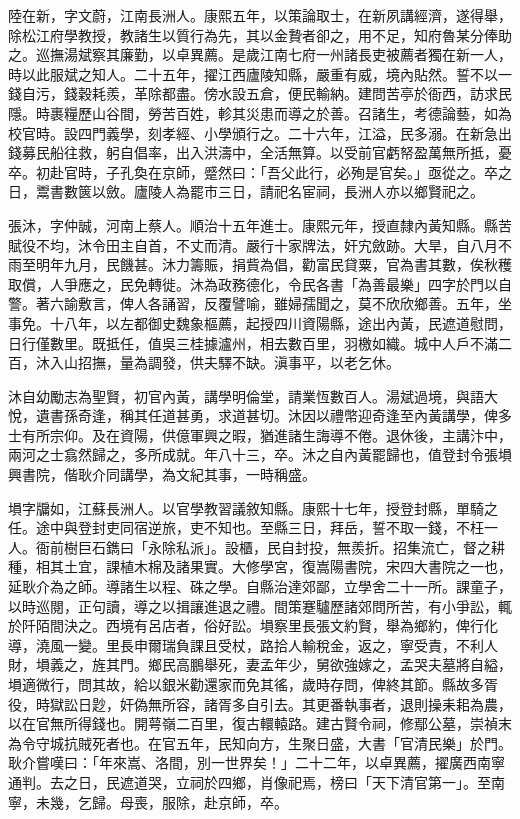 \begin{pinyinscope}
陸在新，字文蔚，江南長洲人。康熙五年，以策論取士，在新夙講經濟，遂得舉，除松江府學教授，教諸生以質行為先，其以金贄者卻之，用不足，知府魯某分俸助之。巡撫湯斌察其廉勤，以卓異薦。是歲江南七府一州諸長吏被薦者獨在新一人，時以此服斌之知人。二十五年，擢江西廬陵知縣，嚴重有威，境內貼然。誓不以一錢自污，錢穀耗羨，革除都盡。傍水設五倉，便民輸納。建問苦亭於衙西，訪求民隱。時裹糧歷山谷間，勞苦百姓，軫其災患而導之於善。召諸生，考德論藝，如為校官時。設四門義學，刻孝經、小學頒行之。二十六年，江溢，民多溺。在新急出錢募民船往救，躬自倡率，出入洪濤中，全活無算。以受前官虧帑盈萬無所抵，憂卒。初赴官時，子孔奐在京師，蹙然曰：「吾父此行，必殉是官矣。」亟從之。卒之日，鬻書數篋以斂。廬陵人為罷市三日，請祀名宦祠，長洲人亦以鄉賢祀之。

張沐，字仲誠，河南上蔡人。順治十五年進士。康熙元年，授直隸內黃知縣。縣苦賦役不均，沐令田主自首，不丈而清。嚴行十家牌法，奸宄斂跡。大旱，自八月不雨至明年九月，民饑甚。沐力籌賑，捐貲為倡，勸富民貸粟，官為書其數，俟秋穫取償，人爭應之，民免轉徙。沐為政務德化，令民各書「為善最樂」四字於門以自警。著六諭敷言，俾人各誦習，反覆譬喻，雖婦孺聞之，莫不欣欣鄉善。五年，坐事免。十八年，以左都御史魏象樞薦，起授四川資陽縣，途出內黃，民遮道慰問，日行僅數里。既抵任，值吳三桂據瀘州，相去數百里，羽檄如織。城中人戶不滿二百，沐入山招撫，量為調發，供夫驛不缺。滇事平，以老乞休。

沐自幼勵志為聖賢，初官內黃，講學明倫堂，請業恆數百人。湯斌過境，與語大悅，遺書孫奇逢，稱其任道甚勇，求道甚切。沐因以禮幣迎奇逢至內黃講學，俾多士有所宗仰。及在資陽，供億軍興之暇，猶進諸生誨導不倦。退休後，主講汴中，兩河之士翕然歸之，多所成就。年八十三，卒。沐之自內黃罷歸也，值登封令張塤興書院，偕耿介同講學，為文紀其事，一時稱盛。

塤字牖如，江蘇長洲人。以官學教習議敘知縣。康熙十七年，授登封縣，單騎之任。途中與登封吏同宿逆旅，吏不知也。至縣三日，拜岳，誓不取一錢，不枉一人。衙前樹巨石鐫曰「永除私派」。設櫃，民自封投，無羨折。招集流亡，督之耕種，相其土宜，課植木棉及諸果實。大修學宮，復嵩陽書院，宋四大書院之一也，延耿介為之師。導諸生以程、硃之學。自縣治達郊鄙，立學舍二十一所。課童子，以時巡閱，正句讀，導之以揖讓進退之禮。間策蹇驢歷諸郊問所苦，有小爭訟，輒於阡陌間決之。西境有呂店者，俗好訟。塤察里長張文約賢，舉為鄉約，俾行化導，澆風一變。里長申爾瑞負課且受杖，路拾人輸稅金，返之，寧受責，不利人財，塤義之，旌其門。鄉民高鵬舉死，妻孟年少，舅欲強嫁之，孟哭夫墓將自縊，塤適微行，問其故，給以銀米勸還家而免其徭，歲時存問，俾終其節。縣故多胥役，時獄訟日尟，奸偽無所容，諸胥多自引去。其更番執事者，退則操耒耜為農，以在官無所得錢也。開萼嶺二百里，復古轘轅路。建古賢令祠，修鄢公墓，崇禎末為令守城抗賊死者也。在官五年，民知向方，生聚日盛，大書「官清民樂」於門。耿介嘗嘆曰：「年來嵩、洛間，別一世界矣！」二十二年，以卓異薦，擢廣西南寧通判。去之日，民遮道哭，立祠於四鄉，肖像祀焉，榜曰「天下清官第一」。至南寧，未幾，乞歸。母喪，服除，赴京師，卒。


\end{pinyinscope}
